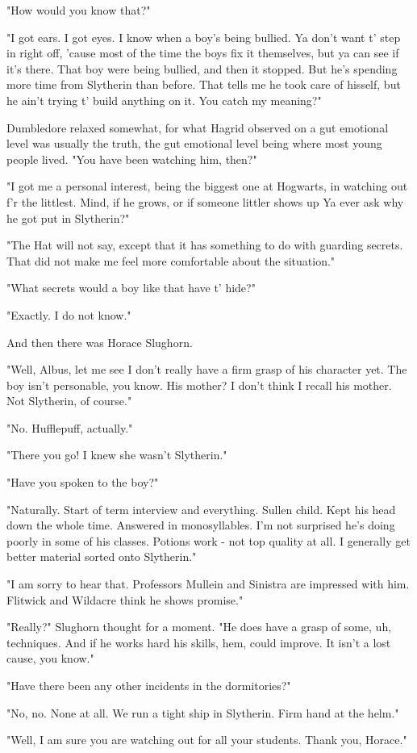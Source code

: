 "How would you know that?"

"I got ears. I got eyes. I know when a boy's being bullied. Ya don't want t' step in right off, 'cause most of the time the boys fix it themselves, but ya can see if it's there. That boy were being bullied, and then it stopped. But he's spending more time from Slytherin than before. That tells me he took care of hisself, but he ain't trying t' build anything on it. You catch my meaning?"

Dumbledore relaxed somewhat, for what Hagrid observed on a gut emotional level was usually the truth, the gut emotional level being where most young people lived. "You have been watching him, then?"

"I got me a personal interest, being the biggest one at Hogwarts, in watching out f'r the littlest. Mind, if he grows, or if someone littler shows up{\el} Ya ever ask why he got put in Slytherin?"

"The Hat will not say, except that it has something to do with guarding secrets. That did not make me feel more comfortable about the situation."

"What secrets would a boy like that have t' hide?"

"Exactly. I do not know."

And then there was Horace Slughorn.

"Well, Albus, let me see{\el} I don't really have a firm grasp of his character yet. The boy isn't personable, you know. His mother? I don't think I recall his mother. Not Slytherin, of course."

"No. Hufflepuff, actually."

"There you go! I knew she wasn't Slytherin."

"Have you spoken to the boy?"

"Naturally. Start of term interview and everything. Sullen child. Kept his head down the whole time. Answered in monosyllables. I'm not surprised he's doing poorly in some of his classes. Potions work - not top quality at all. I generally get better material sorted onto Slytherin."

"I am sorry to hear that. Professors Mullein and Sinistra are impressed with him. Flitwick and Wildacre think he shows promise."

"Really?" Slughorn thought for a moment. "He does have a grasp of some, uh, techniques. And if he works hard his skills, hem, could improve. It isn't a lost cause, you know."

"Have there been any other incidents in the dormitories?"

"No, no. None at all. We run a tight ship in Slytherin. Firm hand at the helm."

"Well, I am sure you are watching out for all your students. Thank you, Horace."



